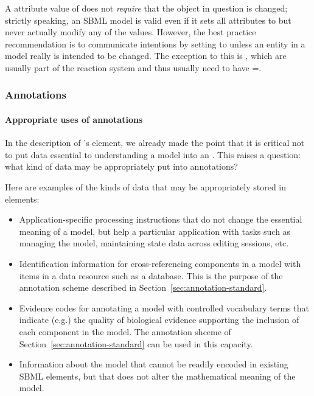 A  attribute value of  does not
\emph{require} that the object in question is changed; strictly
speaking, an SBML model is valid even if it sets all
 attributes to  but never actually
modify any of the values.  However, the best practice
recommendation is to communicate intentions by setting
 to  unless an entity in a model really
is intended to be changed.  The exception to this is \Species,
which are usually part of the reaction system and thus usually
need to have =.


\subsubsection{Annotations}
\label{sec:bp:annotations}

\paragraph{Appropriate uses of annotations}

In the description of \SBase's  element, we
already made the point that it is critical not to put data
essential to understanding a model into an .
This raises a question: what kind of data may be appropriately
put into annotations?

Here are examples of the kinds of data that may be appropriately
stored in  elements: 
\begin{itemize}

\item Application-specific processing instructions that do not
  change the essential meaning of a model, but help a particular
  application with tasks such as managing the model, maintaining
  state data across editing sessions, etc.

\item Identification information for cross-referencing components
  in a model with items in a data resource such as a database.
  This is the purpose of the annotation scheme described in
  Section~\ref{sec:annotation-standard}.

\item Evidence codes for annotating a model with controlled
  vocabulary terms that indicate (e.g.) the quality of biological
  evidence supporting the inclusion of each component in the
  model.  The annotation shceme of
  Section~\ref{sec:annotation-standard} can be used in this
  capacity.

\item Information about the model that cannot be readily encoded
  in existing SBML elements, but that does not alter the
  mathematical meaning of the model.

\end{itemize}


